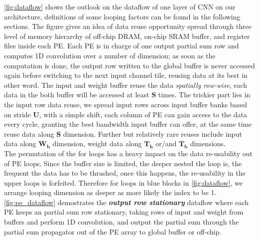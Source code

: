 \autoref{fig:dataflow} shows the outlook on the dataflow of one layer of CNN on our architecture, definitions of some looping factors can be found in the following sections. The figure gives an idea of data reuse opportunity spread through three level of memory hierarchy of off-chip DRAM, on-chip SRAM buffer, and register files inside each PE. Each PE is in charge of one output partial sum row and computes 1D convolution over a number of dimension; as soon as the computation is done, the output row written to the global buffer is never accessed again before switching to the next input channel tile, reusing data at its best in other word. The input and weight buffer reuse the data \textit{spatially row-wise}, each data in the both buffer will be accessed at least $\boldsymbol{S}$ times. The trickier part lies in the input row data reuse, we spread input rows across input buffer banks based on stride $\boldsymbol{U}$, with a simple shift, each column of PE can gain access to the data every cycle, granting the best bandwidth input buffer can offer, at the same time reuse data along $\boldsymbol{S}$ dimension. Further but relatively rare reuses include input data along $\boldsymbol{W_b}$ dimension, weight data along $\boldsymbol{T_h}$ or/and $\boldsymbol{T_b}$ dimensions.  \\
The permutation of the for loops has a heavy impact on the data re-usability out of PE loops. Since the buffer size is limited, the deeper nested the loop is, the frequent the data has to be thrashed, once this happens, the re-usability in the upper loops is forfeited. Therefore for loops in blue blocks in \autoref{fig:dataflow}, we arrange looping dimension as deeper as more likely the index to be 1. \\
\autoref{fig:pe_dataflow} demostrates the \textbf{\textit{output row stationary}} dataflow where each PE keeps an partial sum row stationary, taking rows of input and weight from buffers and perform 1D convolution, and output the partial sum through the partial sum propagator out of the PE array to global buffer or off-chip. 
